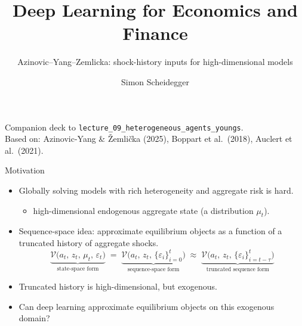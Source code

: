 \documentclass[aspectratio=169,11pt]{beamer}
\title[Deep Learning for Dynamic Economic Models]
{Deep Learning for Economics and Finance}
\subtitle{Azinovic--Yang--Zemlicka: shock-history inputs for high-dimensional models}
\author{Simon Scheidegger}
\institute[HEC Lausanne]{HEC, University of Lausanne}
\date{}
\newcommand{\emphc}[1]{\textcolor{harvardcrimson}{#1}}
\begin{document}
{
\begin{frame}
\titlepage
\vspace{-0.4cm}
\begin{center}
{\footnotesize Companion deck to \texttt{lecture\_09\_heterogeneous\_agents\_youngs}.}\\[4pt]
{\footnotesize Based on: Azinovic-Yang \& \v{Z}emli\v{c}ka (2025), Boppart et al.\ (2018), Auclert et al.\ (2021).}
\end{center}
\end{frame}
}


\begin{frame}{Motivation}
\small
\begin{itemize}\itemsep6pt
\item Globally solving models with rich \emphc{heterogeneity} and \emphc{aggregate risk} is hard.
    \begin{itemize}
        \item[$\rightarrow$] high-dimensional \emphc{endogenous} aggregate state (a distribution $\mu_t$).
    \end{itemize}

\item \emphc{Sequence-space idea:} approximate equilibrium objects as a function of a \emphc{truncated history of aggregate shocks}.
\[
\underbrace{\mathcal{V}\bigl(a_t,\, z_t,\, \mu_t,\, \varepsilon_t\bigr)}_{\text{state-space form}}
\;=\;
\underbrace{\mathcal{V}\bigl(a_t,\, z_t,\, \{\varepsilon_i\}_{i=0}^{t}\bigr)}_{\text{sequence-space form}}
\;\approx\;
\underbrace{\mathcal{V}\bigl(a_t,\, z_t,\, \{\varepsilon_i\}_{i=t-\tau}^{t}\bigr)}_{\text{truncated sequence form}}
\]

\item Truncated history is high-dimensional, but \emphc{exogenous}.
\item Can deep learning approximate equilibrium objects on this exogenous domain?
\end{itemize}
\end{frame}
\end{document}
